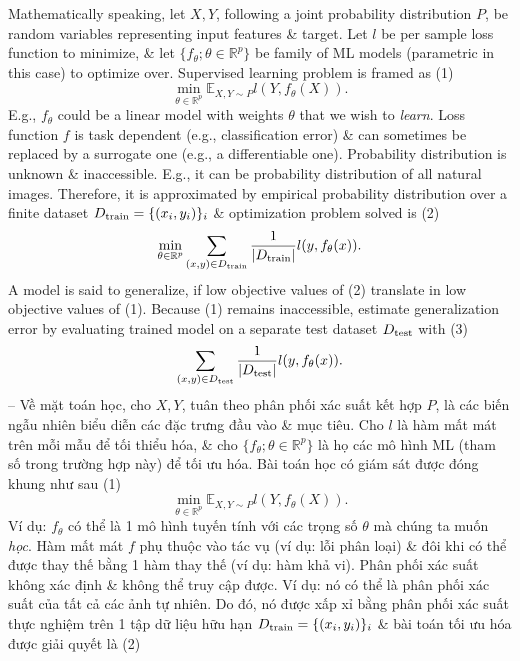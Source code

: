 \documentclass{article}
\begin{document}
\begin{itemize}
\begin{itemize}
\begin{itemize}
            Mathematically speaking, let $X,Y$, following a joint probability distribution $P$, be random variables representing input features \& target. Let $l$ be per sample loss function to minimize, \& let $\{f_\theta;\theta\in\mathbb{R}^p\}$ be family of ML models (parametric in this case) to optimize over. Supervised learning problem is framed as (1)
            \begin{equation*}
                \min_{\theta\in\mathbb{R}^p} \mathbb{E}_{X,Y\sim P} l(Y,f_\theta(X)).
            \end{equation*}
            E.g., $f_\theta$ could be a linear model with weights $\theta$ that we wish to {\it learn}. Loss function $f$ is task dependent (e.g., classification error) \& can sometimes be replaced by a surrogate one (e.g., a differentiable one). Probability distribution is unknown \& inaccessible. E.g., it can be probability distribution of all natural images. Therefore, it is approximated by empirical probability distribution over a finite dataset $D_{\rm train} = \{(x_i,y_i)\}_i$ \& optimization problem solved is (2)
            \begin{equation*}
                \min_{\theta\in\mathbb{R}^p}\sum_{(x,y)\in D_{\rm train}} \frac{1}{|D_{\rm train}|}l(y,f_\theta(x)).
            \end{equation*}
            A model is said to generalize, if low objective values of (2) translate in low objective values of (1). Because (1) remains inaccessible, estimate generalization error by evaluating trained model on a separate test dataset $D_{\rm test}$ with (3)
            \begin{equation*}
                \sum_{(x,y)\in D_{\rm test}} \frac{1}{|D_{\rm test}|}l(y,f_\theta(x)).
            \end{equation*}
            -- Về mặt toán học, cho $X,Y$, tuân theo phân phối xác suất kết hợp $P$, là các biến ngẫu nhiên biểu diễn các đặc trưng đầu vào \& mục tiêu. Cho $l$ là hàm mất mát trên mỗi mẫu để tối thiểu hóa, \& cho $\{f_\theta;\theta\in\mathbb{R}^p\}$ là họ các mô hình ML (tham số trong trường hợp này) để tối ưu hóa. Bài toán học có giám sát được đóng khung như sau (1)
            \begin{equation*}
                \min_{\theta\in\mathbb{R}^p} \mathbb{E}_{X,Y\sim P} l(Y,f_\theta(X)).
            \end{equation*}
            Ví dụ: $f_\theta$ có thể là 1 mô hình tuyến tính với các trọng số $\theta$ mà chúng ta muốn {\it học}. Hàm mất mát $f$ phụ thuộc vào tác vụ (ví dụ: lỗi phân loại) \& đôi khi có thể được thay thế bằng 1 hàm thay thế (ví dụ: hàm khả vi). Phân phối xác suất không xác định \& không thể truy cập được. Ví dụ: nó có thể là phân phối xác suất của tất cả các ảnh tự nhiên. Do đó, nó được xấp xỉ bằng phân phối xác suất thực nghiệm trên 1 tập dữ liệu hữu hạn $D_{\rm train} = \{(x_i,y_i)\}_i$ \& bài toán tối ưu hóa được giải quyết là (2)

\end{itemize}
\end{itemize}
\end{itemize}
\end{document}
